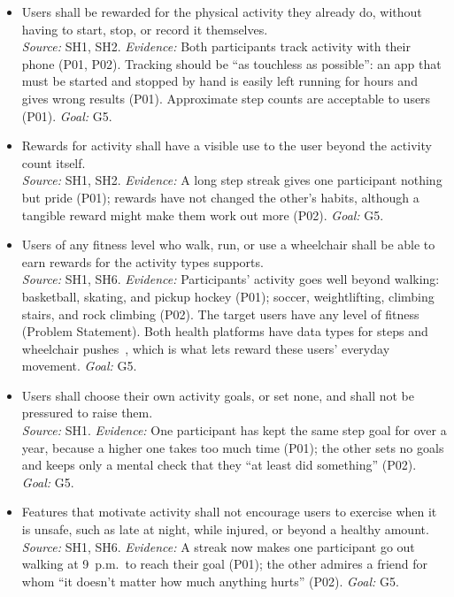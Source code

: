 \documentclass[12pt]{article}
\newcounter{srnum} %
\begin{document}
{\sloppy
  \noindent\begin{itemize}
    \item[SR\refstepcounter{srnum}\thesrnum\label{SR_EarnFromActivity}:] Users shall be rewarded for the physical activity they already do, without having to start, stop, or record it themselves.\\
          \emph{Source:} SH1, SH2. \emph{Evidence:} Both participants track activity with their phone (P01, P02). Tracking should be ``as touchless as possible'': an app that must be started and stopped by hand is easily left running for hours and gives wrong results (P01). Approximate step counts are acceptable to users (P01). \emph{Goal:} G5.
    \item[SR\refstepcounter{srnum}\thesrnum\label{SR_UsefulRewards}:] Rewards for activity shall have a visible use to the user beyond the activity count itself.\\
          \emph{Source:} SH1, SH2. \emph{Evidence:} A long step streak gives one participant nothing but pride (P01); rewards have not changed the other's habits, although a tangible reward might make them work out more (P02). \emph{Goal:} G5.
    \item[SR\refstepcounter{srnum}\thesrnum\label{SR_AllAbilities}:] Users of any fitness level who walk, run, or use a wheelchair shall be able to earn rewards for the activity types \progname{} supports.\\
          \emph{Source:} SH1, SH6. \emph{Evidence:} Participants' activity goes well beyond walking: basketball, skating, and pickup hockey (P01); soccer, weightlifting, climbing stairs, and rock climbing (P02). The target users have any level of fitness (Problem Statement). Both health platforms have data types for steps and wheelchair pushes~\citep{AppleHealthKit, GoogleHealthConnect}, which is what lets \progname{} reward these users' everyday movement. \emph{Goal:} G5.
    \item[SR\refstepcounter{srnum}\thesrnum\label{SR_OwnGoals}:] Users shall choose their own activity goals, or set none, and shall not be pressured to raise them.\\
          \emph{Source:} SH1. \emph{Evidence:} One participant has kept the same step goal for over a year, because a higher one takes too much time (P01); the other sets no goals and keeps only a mental check that they ``at least did something'' (P02). \emph{Goal:} G5.
    \item[SR\refstepcounter{srnum}\thesrnum\label{SR_SafeMotivation}:] Features that motivate activity shall not encourage users to exercise when it is unsafe, such as late at night, while injured, or beyond a healthy amount.\\
          \emph{Source:} SH1, SH6. \emph{Evidence:} A streak now makes one participant go out walking at 9~p.m.\ to reach their goal (P01); the other admires a friend for whom ``it doesn't matter how much anything hurts'' (P02). \emph{Goal:} G5.
\end{itemize}
  \par}
\end{document}
